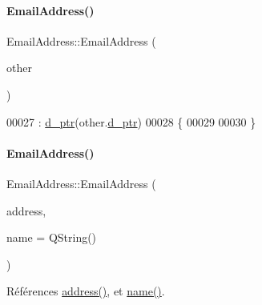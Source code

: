 \paragraph{\texorpdfstring{Email\+Address()}{EmailAddress()}\hspace{0.1cm}{\footnotesize\ttfamily [2/3]}}
{\footnotesize\ttfamily Email\+Address\+::\+Email\+Address (\begin{DoxyParamCaption}\item[{const \hyperlink{class_simple_mail_1_1_email_address}{Email\+Address} \&}]{other }\end{DoxyParamCaption})}


\begin{DoxyCode}
00027                                                     : \hyperlink{class_simple_mail_1_1_email_address_a27188c75c77a942e79cac0420788f214}{d\_ptr}(other.\hyperlink{class_simple_mail_1_1_email_address_a27188c75c77a942e79cac0420788f214}{d\_ptr})
00028 \{
00029 
00030 \}
\end{DoxyCode}
\mbox{\label{class_simple_mail_1_1_email_address_a8bfbbe6dbdc1f420a7e6c7e52468bd54}} 
\paragraph{\texorpdfstring{Email\+Address()}{EmailAddress()}\hspace{0.1cm}{\footnotesize\ttfamily [3/3]}}
{\footnotesize\ttfamily Email\+Address\+::\+Email\+Address (\begin{DoxyParamCaption}\item[{const Q\+String \&}]{address,  }\item[{const Q\+String \&}]{name = {\ttfamily QString()} }\end{DoxyParamCaption})}



Références \hyperlink{class_simple_mail_1_1_email_address_a426faf41f9f1c56014a97eec4d37ba4a}{address()}, et \hyperlink{class_simple_mail_1_1_email_address_a311fdcf9bc548a3db4a985b396ab5355}{name()}.


